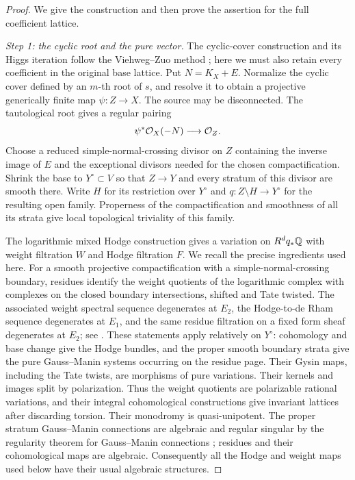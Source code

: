 \begin{proof}
We give the construction and then prove the assertion for the full
coefficient lattice.

\smallskip\noindent\emph{Step 1: the cyclic root and the pure vector.}
The cyclic-cover construction and its Higgs iteration follow the
Viehweg--Zuo method \cite[\S3]{ViehwegZuoIsotriviality}; here we must also
retain every coefficient in the original base lattice.
Put $N=K_X+E$. Normalize the cyclic cover defined by an $m$-th root
of $s$, and resolve it to obtain a projective generically finite map
$\psi:Z\to X$.  The source may be disconnected.  The tautological
root gives a regular pairing
\begin{equation}\label{eq:log-root-pairing}
 \psi^*\mathcal O_X(-N)\longrightarrow\mathcal O_Z.
\end{equation}
Choose a reduced simple-normal-crossing divisor on $Z$ containing
the inverse image of $E$ and the exceptional divisors needed for the
chosen compactification.  Shrink the base to $Y^\circ\subset V$ so
that $Z\to Y$ and every stratum of this divisor are smooth there.
Write $H$ for its restriction over $Y^\circ$ and
$q:Z\setminus H\to Y^\circ$ for the resulting open family.  Properness
of the compactification and smoothness of all its strata give local
topological triviality of this family.

The logarithmic mixed Hodge construction gives a variation on
$R^d q_*\mathbb Q$ with weight filtration $W$ and Hodge filtration $F$.
We recall the precise ingredients used here.  For a smooth projective
compactification with a simple-normal-crossing boundary, residues
identify the weight quotients of the logarithmic complex with
complexes on the closed boundary intersections, shifted and Tate
twisted.  The associated weight spectral sequence degenerates at
$E_2$, the Hodge-to-de Rham sequence degenerates at $E_1$, and the
same residue filtration on a fixed form sheaf degenerates at $E_2$;
see \cite[\S3.1.5, Theorem~3.2.5 and Corollary~3.2.13]{DeligneHodgeII}.
These statements apply relatively on $Y^\circ$: cohomology and base
change give the Hodge bundles, and the proper smooth boundary strata
give the pure Gauss--Manin systems occurring on the residue page.
Their Gysin maps, including the Tate twists, are morphisms of pure
variations.  Their kernels and images split by polarization.  Thus
the weight quotients are polarizable rational variations, and their
integral cohomological constructions give invariant lattices after
discarding torsion.  Their monodromy is quasi-unipotent.  The proper
stratum Gauss--Manin connections are algebraic and regular singular
by the regularity theorem for Gauss--Manin connections
\cite[Chapter~II, \S6.14 and Theorem~7.9]{DeligneRSE}; residues and their cohomological maps
are algebraic.  Consequently all the Hodge and weight maps used
below have their usual algebraic structures.


\end{proof}
